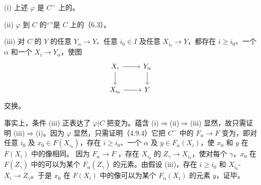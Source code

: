  (i) 上述 $\varphi$ 是 $C^\sim$ 上的。

 (ii) $\varphi$ 到 $C$ 的“”是 $C$ 上的（6.3）。

 (iii) 对 $C$ 的 $Y$ 的任意 $Y_\alpha\to Y$、任意 $i_0\in I$ 及任意 $X_{i_0}\to Y$，都存在 $i\geq i_0$、一个 $\alpha$ 和一个 $X_i\to Y_\alpha$，使图
\[\begin{tikzcd}X_i\arrow[r]\arrow[d]&Y_\alpha\arrow[d]\\X_{i_0}\arrow[r]&Y\end{tikzcd}\]
交换。

事实上，条件 (iii) 正表达了 $\varphi|C$ 把变为。蕴含 (i)$\Rightarrow$(ii)$\Rightarrow$(iii) 显然，故只需证明 (iii)$\Rightarrow$(i)。因为 $\varphi$ 显然，只需证明（4.9.4）它把 $C^\sim$ 中的 $F_\alpha\to F$ 变为，即对任意 $i_0$ 及 $x_0\in F(X_{i_0})$，存在 $i\geq i_0$、一个 $\alpha$ 及 $y\in F_\alpha(X_i)$，使 $x_0$ 和 $y$ 在 $F(X_i)$ 中的像相同。
因为 $F_\alpha\to F$ ，存在 $X_{i_0}$ 的 $Z_\gamma\to X_{i_0}$，使对每个 $\gamma$，$x_0$ 在 $F(Z_\gamma)$ 中的可以为某个 $F_\alpha(Z_\gamma)$ 的元素。由假设 (iii)，存在 $i\geq i_0$ 和 $X_{i_0}$- $X_i\to Z_\gamma$。于是 $x_0$ 在 $F(X_i)$ 中的像可以为某个 $F_\alpha(X_i)$ 的元素 $y$，证毕。

